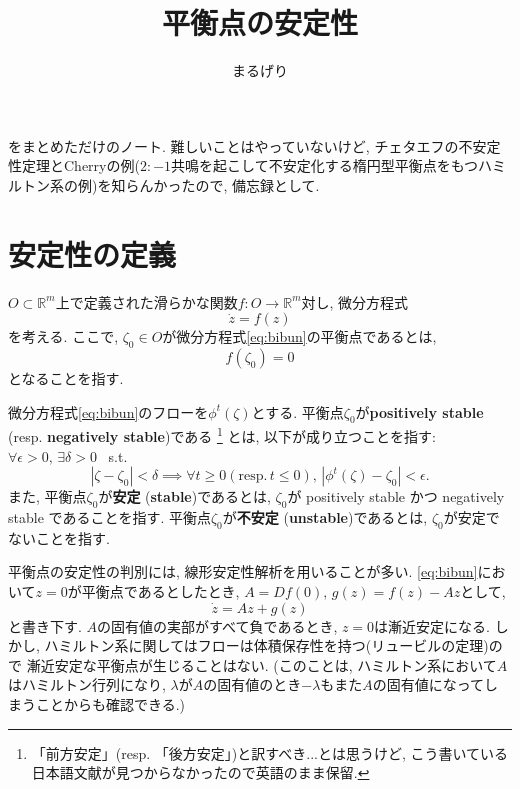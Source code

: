 \documentclass[a4paper]{ujarticle}
\title{平衡点の安定性}
\author{まるげり}
\theoremstyle{definition}
\begin{document}
    \maketitle
    \cite[Chap. 12.1]{Meyer-Offin}をまとめただけのノート.
    難しいことはやっていないけど, 
    チェタエフの不安定性定理とCherryの例($2: - 1$共鳴を起こして不安定化する楕円型平衡点をもつハミルトン系の例)を知らんかったので, 備忘録として.

    \section{安定性の定義}

    $O \subset \mathbb{R}^m$上で定義された滑らかな関数$f: O \rightarrow \mathbb{R}^{m}$対し,
    微分方程式
    \begin{equation} \label{eq:bibun}
        \dot{z} = f(z)
    \end{equation}
    を考える. 
    ここで, $\zeta_0 \in O$が微分方程式\eqref{eq:bibun}の平衡点であるとは, 
    \[
        f(\zeta_0) = 0
    \]
    となることを指す.

    微分方程式\eqref{eq:bibun}のフローを$\phi^{t}(\zeta)$とする.
    平衡点$\zeta_0$が\textbf{positively stable} (resp. \textbf{negatively stable})である
    \footnote{「前方安定」(resp. 「後方安定」)と訳すべき...とは思うけど, こう書いている日本語文献が見つからなかったので英語のまま保留.}
    とは, 以下が成り立つことを指す: \\
    $\forall \epsilon > 0, \, \exists \delta > 0$ \ s.t.
    \[
        |\zeta - \zeta_0| < \delta \implies \forall t \geq 0 (\text{resp.}\, t \leq 0), \, |\phi^{t}(\zeta) - \zeta_0| < \epsilon.
    \]
    また, 平衡点$\zeta_0$が\textbf{安定} (\textbf{stable})であるとは, 
    $\zeta_0$が positively stable かつ negatively stable であることを指す.
    平衡点$\zeta_0$が\textbf{不安定} (\textbf{unstable})であるとは, $\zeta_0$が安定でないことを指す.

    平衡点の安定性の判別には, 線形安定性解析を用いることが多い. 
    \eqref{eq:bibun}において$z = 0$が平衡点であるとしたとき,
    $A = Df(0), \, g(z) = f(z) - Az$として, 
    \[
        \dot{z} = Az + g(z)
    \]
    と書き下す. 
    $A$の固有値の実部がすべて負であるとき, $z = 0$は漸近安定になる. 
    しかし, ハミルトン系に関してはフローは体積保存性を持つ(リュービルの定理)ので
    漸近安定な平衡点が生じることはない.
    (このことは, ハミルトン系において$A$はハミルトン行列になり, 
    $\lambda$が$A$の固有値のとき$- \lambda$もまた$A$の固有値になってしまうことからも確認できる.)
\end{document}
